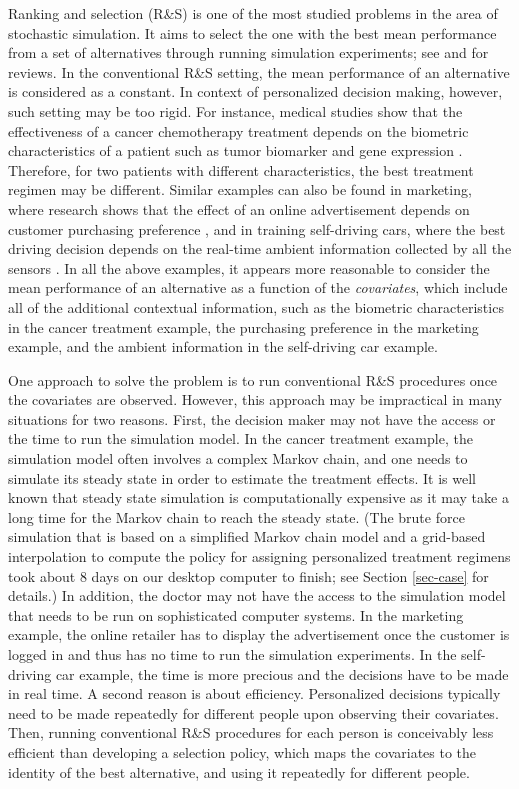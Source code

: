 \documentclass[ijoc,nonblindrev]{informs3}
\begin{document}
Ranking and selection (R\&S) is one of the most studied problems in the area of stochastic simulation.
It aims to select the one with the best mean performance from a set of alternatives through running simulation experiments; see \cite{kim2006} and \cite{ChenChickLeePujowidianto15} for reviews.
In the conventional R\&S setting, the mean performance of an alternative is considered as a constant.
In context of personalized decision making, however, such setting may be too rigid.
For instance, medical studies show that the effectiveness of a cancer chemotherapy treatment depends on the biometric characteristics of a patient such as tumor biomarker and gene expression \citep{yap2009,kim2011short}.
Therefore, for two patients with different characteristics, the best treatment regimen may be different.
Similar examples can also be found in marketing, where research shows that the effect of an online advertisement depends on customer purchasing preference \citep{arora2008},
and in training self-driving cars, where the best driving decision depends on the real-time ambient information collected by all the sensors \citep{katrakazas2015real}.
In all the above examples, it appears more reasonable to consider the mean performance of an alternative as a function of the \textit{covariates}, which include all of the additional contextual information,
such as the biometric characteristics in the cancer treatment example, the purchasing preference in the marketing example, and the ambient information in the self-driving car example.


One approach to solve the problem is to run conventional R\&S procedures once the covariates are observed.
However, this approach may be impractical in many situations for two reasons.
First, the decision maker may not have the access or the time to run the simulation model.
In the cancer treatment example, the simulation model often involves a complex Markov chain, and
one needs to simulate its steady state in order to estimate the treatment effects. It is well known that steady state simulation is computationally expensive as it may take a long time for the Markov chain to reach the steady state.
(The brute force simulation that is based on a simplified Markov chain model and a grid-based interpolation to compute the policy for assigning personalized treatment regimens took about 8 days on our desktop computer to finish; see Section \ref{sec-case} for details.)
In addition, the doctor may not have the access to the simulation model that needs to be run on sophisticated computer systems.
In the marketing example, the online retailer has to display the advertisement once the customer is logged in and thus has no time to run the simulation experiments.
In the self-driving car example, the time is more precious and the decisions have to be made in real time.
A second reason is about efficiency. Personalized decisions typically need to be made repeatedly for different people upon observing their covariates.
Then, running conventional R\&S procedures for each person is conceivably less efficient than developing a selection policy, which maps the covariates to the identity of the best alternative, and using it repeatedly for different people.
\end{document}
